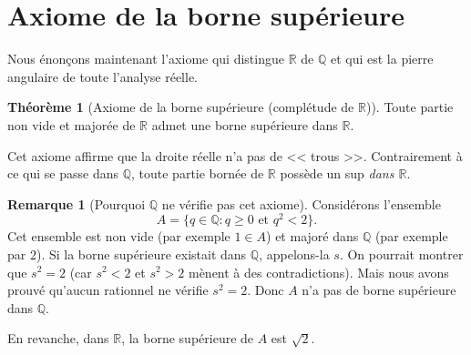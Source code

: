 \documentclass[12pt,a4paper,openany]{book}
\theoremstyle{definition}
\newtheorem{theoreme}{Théorème}[chapter]
\newtheorem{remarque}{Remarque}[chapter]
\newcommand{\Q}{\mathbb{Q}}
\newcommand{\R}{\mathbb{R}}
\newcommand{\eps}{\varepsilon}
\begin{document}
\begin{center}
\end{center}


\section{Axiome de la borne supérieure}
\label{sec:axiome-sup}

Nous énonçons maintenant l'axiome qui distingue $\R$ de $\Q$ et qui est la pierre angulaire de toute l'analyse réelle.

\begin{theoreme}[Axiome de la borne supérieure (complétude de $\R$)]\label{thm:completude}
  Toute partie non vide et majorée de $\R$ admet une borne supérieure dans $\R$.
\end{theoreme}

Cet axiome affirme que la droite réelle n'a pas de << trous >>. Contrairement à ce qui se passe dans $\Q$, toute partie bornée de $\R$ possède un sup \emph{dans $\R$}.

\begin{remarque}[Pourquoi $\Q$ ne vérifie pas cet axiome]\label{rem:Q-pas-complet}
  Considérons l'ensemble
  \[
    A = \{q \in \Q : q \geq 0 \text{ et } q^2 < 2\}.
  \]
  Cet ensemble est non vide (par exemple $1 \in A$) et majoré dans $\Q$ (par exemple par $2$). Si la borne supérieure existait dans $\Q$, appelons-la $s$. On pourrait montrer que $s^2 = 2$ (car $s^2 < 2$ et $s^2 > 2$ mènent à des contradictions). Mais nous avons prouvé qu'aucun rationnel ne vérifie $s^2 = 2$. Donc $A$ n'a pas de borne supérieure dans $\Q$.

  En revanche, dans $\R$, la borne supérieure de $A$ est $\sqrt{2}$.
\end{remarque}
\end{document}
